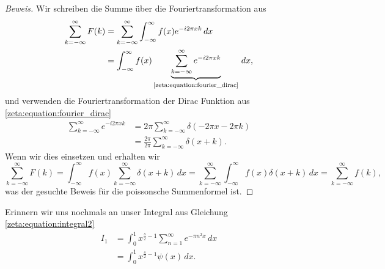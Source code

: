 \begin{proof}[Beweis]
    Wir schreiben die Summe über die Fouriertransformation aus
    \begin{align}
        \sum_{k=-\infty}^{\infty}
        F(k)
        &=
        \sum_{k=-\infty}^{\infty}
        \int_{-\infty}^{\infty}
        f(x)
        e^{-i 2\pi x k}
        \, dx
        \\
        &=
        \int_{-\infty}^{\infty}
        f(x)
        \underbrace{
        \sum_{k=-\infty}^{\infty}
        e^{-i 2\pi x k}
        }_{\text{\eqref{zeta:equation:fourier_dirac}}}
        \, dx,
    \end{align}
    und verwenden die Fouriertransformation der Dirac Funktion aus \eqref{zeta:equation:fourier_dirac}
    \begin{align}
        \sum_{k=-\infty}^{\infty}
        e^{-i 2\pi x k}
        &=
        2 \pi
        \sum_{k=-\infty}^{\infty}
        \delta(-2\pi x - 2\pi k)
        \\
        &=
        \frac{2 \pi}{2 \pi}
        \sum_{k=-\infty}^{\infty}
        \delta(x + k).
    \end{align}
    Wenn wir dies einsetzen und erhalten wir
    \begin{equation}
        \sum_{k=-\infty}^{\infty}
        F(k)
        =
        \int_{-\infty}^{\infty}
        f(x)
        \sum_{k=-\infty}^{\infty}
        \delta(x + k)
        \, dx
        =
        \sum_{k=-\infty}^{\infty}
        \int_{-\infty}^{\infty}
        f(x)
        \delta(x + k)
        \, dx
        =
        \sum_{k=-\infty}^{\infty}
        f(k),
    \end{equation}
    was der gesuchte Beweis für die poissonsche Summenformel ist.
\end{proof}

Erinnern wir uns nochmals an unser Integral aus Gleichung \eqref{zeta:equation:integral2}
\begin{align*}
    I_1
    &=
    \int_0^{1}
    x^{\frac{s}{2}-1}
    \sum_{n=1}^{\infty}
    e^{-\pi n^2 x}
    \,dx
    \\
    &=
    \int_0^{1}
    x^{\frac{s}{2}-1}
    \psi(x)
    \,dx
    .
\end{align*}

